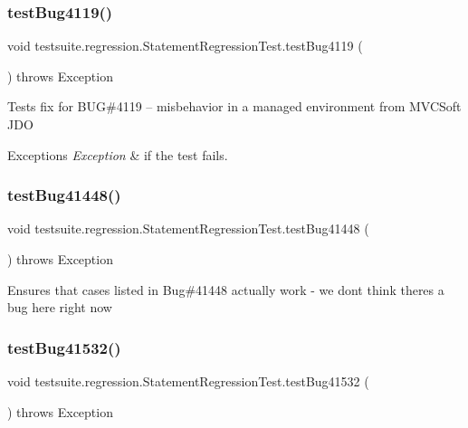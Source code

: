 \subsubsection{\texorpdfstring{test\+Bug4119()}{testBug4119()}}
{\footnotesize\ttfamily void testsuite.\+regression.\+Statement\+Regression\+Test.\+test\+Bug4119 (\begin{DoxyParamCaption}{ }\end{DoxyParamCaption}) throws Exception}

Tests fix for B\+UG\#4119 -- misbehavior in a managed environment from M\+V\+C\+Soft J\+DO


\begin{DoxyExceptions}{Exceptions}
{\em Exception} & if the test fails. \\
\hline
\end{DoxyExceptions}
\mbox{\label{classtestsuite_1_1regression_1_1_statement_regression_test_ab774e215dfc6ff4840c43c20d00a90dd}} 
\subsubsection{\texorpdfstring{test\+Bug41448()}{testBug41448()}}
{\footnotesize\ttfamily void testsuite.\+regression.\+Statement\+Regression\+Test.\+test\+Bug41448 (\begin{DoxyParamCaption}{ }\end{DoxyParamCaption}) throws Exception}

Ensures that cases listed in Bug\#41448 actually work -\/ we don\textquotesingle{}t think there\textquotesingle{}s a bug here right now \mbox{\label{classtestsuite_1_1regression_1_1_statement_regression_test_a793c2353636c4363f1d946e6d1645677}} 
\subsubsection{\texorpdfstring{test\+Bug41532()}{testBug41532()}}
{\footnotesize\ttfamily void testsuite.\+regression.\+Statement\+Regression\+Test.\+test\+Bug41532 (\begin{DoxyParamCaption}{ }\end{DoxyParamCaption}) throws Exception}

